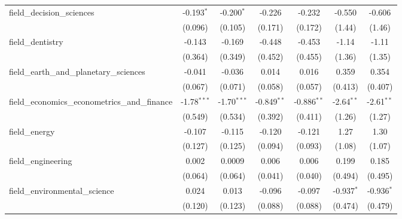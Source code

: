 \begin{tabular}{lcccccc}
   field\_decision\_sciences                                   & -0.193$^{*}$   & -0.200$^{*}$  & -0.226        & -0.232        & -0.550        & -0.606\\   
                                                               & (0.096)        & (0.105)       & (0.171)       & (0.172)       & (1.44)        & (1.46)\\   
   field\_dentistry                                            & -0.143         & -0.169        & -0.448        & -0.453        & -1.14         & -1.11\\   
                                                               & (0.364)        & (0.349)       & (0.452)       & (0.455)       & (1.36)        & (1.35)\\   
   field\_earth\_and\_planetary\_sciences                      & -0.041         & -0.036        & 0.014         & 0.016         & 0.359         & 0.354\\   
                                                               & (0.067)        & (0.071)       & (0.058)       & (0.057)       & (0.413)       & (0.407)\\   
   field\_economics\_econometrics\_and\_finance                & -1.78$^{***}$  & -1.70$^{***}$ & -0.849$^{**}$ & -0.886$^{**}$ & -2.64$^{**}$  & -2.61$^{**}$\\   
                                                               & (0.549)        & (0.534)       & (0.392)       & (0.411)       & (1.26)        & (1.27)\\   
   field\_energy                                               & -0.107         & -0.115        & -0.120        & -0.121        & 1.27          & 1.30\\   
                                                               & (0.127)        & (0.125)       & (0.094)       & (0.093)       & (1.08)        & (1.07)\\   
   field\_engineering                                          & 0.002          & 0.0009        & 0.006         & 0.006         & 0.199         & 0.185\\   
                                                               & (0.064)        & (0.064)       & (0.041)       & (0.040)       & (0.494)       & (0.495)\\   
   field\_environmental\_science                               & 0.024          & 0.013         & -0.096        & -0.097        & -0.937$^{*}$  & -0.936$^{*}$\\   
                                                               & (0.120)        & (0.123)       & (0.088)       & (0.088)       & (0.474)       & (0.479)\\   

\end{tabular}
